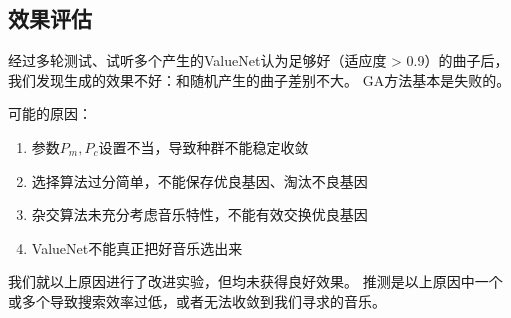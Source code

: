 \documentclass{ctexart}
\begin{document}
\subsection{效果评估}
经过多轮测试、试听多个产生的ValueNet认为足够好（适应度 > 0.9）的曲子后，我们发现生成的效果不好：和随机产生的曲子差别不大。
GA方法基本是失败的。

可能的原因：
\begin{enumerate}[nosep]
  \item 参数$P_m,P_c$设置不当，导致种群不能稳定收敛
  \item 选择算法过分简单，不能保存优良基因、淘汰不良基因
  \item 杂交算法未充分考虑音乐特性，不能有效交换优良基因
  \item ValueNet不能真正把好音乐选出来
\end{enumerate}

我们就以上原因进行了改进实验，但均未获得良好效果。
推测是以上原因中一个或多个导致搜索效率过低，或者无法收敛到我们寻求的音乐。
\end{document}

